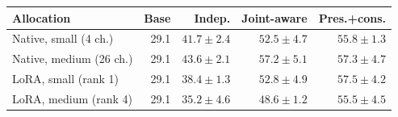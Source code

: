 \begin{tabular}{@{}lrrrr@{}}
\toprule
Allocation & Base & Indep. & Joint-aware & Pres.+cons.\\
\midrule
Native, small (4 ch.) & 29.1 & $41.7 \pm 2.4$ & $52.5 \pm 4.7$ & $55.8 \pm 1.3$\\
Native, medium (26 ch.) & 29.1 & $43.6 \pm 2.1$ & $57.2 \pm 5.1$ & $57.3 \pm 4.7$\\
LoRA, small (rank 1) & 29.1 & $38.4 \pm 1.3$ & $52.8 \pm 4.9$ & $57.5 \pm 4.2$\\
LoRA, medium (rank 4) & 29.1 & $35.2 \pm 4.6$ & $48.6 \pm 1.2$ & $55.5 \pm 4.5$\\
\bottomrule
\end{tabular}
